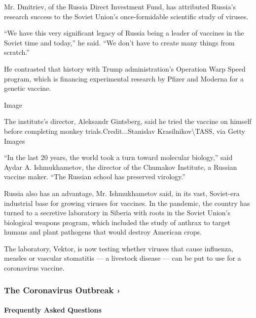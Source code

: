 Mr. Dmitriev, of the Russia Direct Investment Fund, has attributed
Russia's research success to the Soviet Union's once-formidable
scientific study of viruses.

``We have this very significant legacy of Russia being a leader of
vaccines in the Soviet time and today,'' he said. ``We don't have to
create many things from scratch.''

He contrasted that history with Trump administration's Operation Warp
Speed program, which is financing experimental research by Pfizer and
Moderna for a genetic vaccine.

Image

The institute's director, Aleksandr Gintsberg, said he tried the vaccine
on himself before completing monkey trials.Credit...Stanislav
Krasilnikov\textbackslash{}TASS, via Getty Images

``In the last 20 years, the world took a turn toward molecular
biology,'' said Aydar A. Ishmukhametov, the director of the Chumakov
Institute, a Russian vaccine maker. ``The Russian school has preserved
virology.''

Russia also has an advantage, Mr. Ishmukhametov said, in its vast,
Soviet-era industrial base for growing viruses for vaccines. In the
pandemic, the country has turned to a secretive laboratory in Siberia
with roots in the Soviet Union's biological weapons program, which
included the study of anthrax to target humans and plant pathogens that
would destroy American crops.

The laboratory, Vektor, is now testing whether viruses that cause
influenza, measles or vascular stomatitis --- a livestock disease ---
can be put to use for a coronavirus vaccine.

\href{https://www.nytimes.com/news-event/coronavirus?action=click\&pgtype=Article\&state=default\&region=MAIN_CONTENT_3\&context=storylines_faq}{}

\hypertarget{the-coronavirus-outbreak-}{%
\subsubsection{The Coronavirus Outbreak
›}\label{the-coronavirus-outbreak-}}

\hypertarget{frequently-asked-questions}{%
\paragraph{Frequently Asked
Questions}\label{frequently-asked-questions}}

